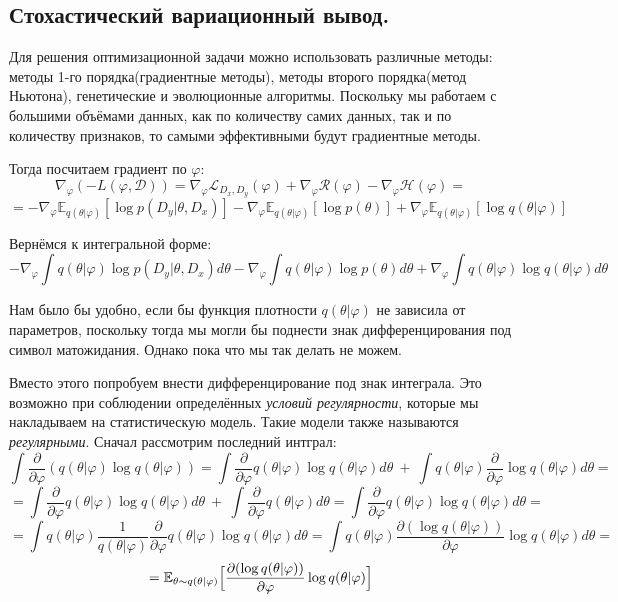 \subsection{Стохастический вариационный вывод.}

Для решения оптимизационной задачи можно использовать различные методы: методы 1-го порядка(градиентные методы), методы второго порядка(метод Ньютона), генетические и эволюционные алгоритмы. Поскольку мы работаем с большими объёмами данных,
 как по количеству самих данных, так и по количеству признаков, то самыми эффективными будут градиентные методы.

Тогда посчитаем градиент по $\varphi$:
$$\nabla_{\varphi} (-L(\varphi, \mathcal{D})) = \nabla_{\varphi} \mathcal{L}_{D_x, D_y}(\varphi) + \nabla_{\varphi} \mathcal{R}(\varphi) - \nabla_{\varphi} \mathcal{H}(\varphi)=$$
$$= -\nabla_{\varphi} \mathbb{E}_{q(\theta | \varphi)}[\log p(D_y | \theta, D_x)] - \nabla_{\varphi} \mathbb{E}_{q(\theta | \varphi)} [\log p(\theta)] +
\nabla_{\varphi} \mathbb{E}_{q(\theta | \varphi)} [\log q(\theta | \varphi)]$$

Вернёмся к интегральной форме:
$$-\nabla_{\varphi} \int q(\theta | \varphi) \log p(D_y | \theta, D_x) d\theta - \nabla_{\varphi} \int q(\theta | \varphi) \log p(\theta) d\theta + \nabla_{\varphi} \int q(\theta | \varphi) \log q(\theta | \varphi) d\theta$$

Нам было бы удобно, если бы функция плотности $q(\theta | \varphi)$ не зависила от параметров, поскольку тогда мы могли бы поднести знак дифференцирования под символ матожидания. Однако пока что мы так делать не можем.

Вместо этого попробуем внести дифференцирование под знак интеграла. Это возможно при соблюдении определённых \textit{условий регулярности}, которые мы накладываем на статистическую модель. Такие модели также называются
 \textit{регулярными}\cite{medvedev-stats}. Сначал рассмотрим последний интграл:
$$\int \frac{\partial}{\partial\varphi} (q(\theta | \varphi) \log q(\theta | \varphi)) = \int \frac{\partial}{\partial\varphi} q(\theta | \varphi) \log q(\theta | \varphi) d\theta\ +\ \int q(\theta | \varphi) \frac{\partial}{\partial\varphi} \log q(\theta | \varphi) d\theta =$$
$$=\int \frac{\partial}{\partial\varphi} q(\theta | \varphi) \log q(\theta | \varphi) d\theta\ +\ \int \frac{\partial}{\partial\varphi} q(\theta | \varphi) d\theta = \int \frac{\partial}{\partial\varphi} q(\theta | \varphi) \log q(\theta | \varphi) d\theta = $$
$$=\int q(\theta | \varphi) \frac{1}{q(\theta | \varphi)} \frac{\partial}{\partial\varphi} q(\theta | \varphi) \log q(\theta | \varphi) d\theta = \int q(\theta | \varphi) \frac{\partial(\log q(\theta | \varphi))}{\partial\varphi} \log q(\theta | \varphi) d\theta=$$
$$=\mathbb{E}_{\theta \sim q(\theta | \varphi)} \Bigl[\frac{\partial(\log q(\theta | \varphi))}{\partial\varphi} \log q(\theta | \varphi)\Bigr]$$


